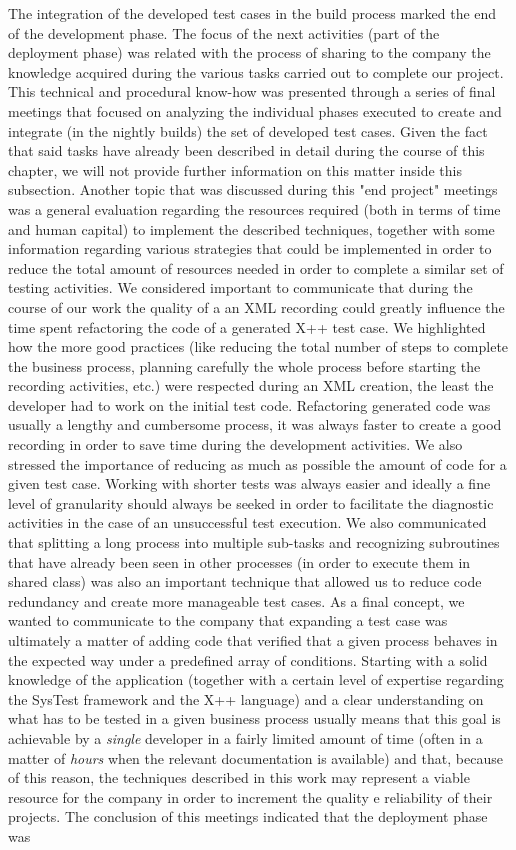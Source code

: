 The integration of the developed test cases in the build process marked the end of the development phase. The focus of the next activities (part of the deployment phase) was related with the process of sharing to the company the knowledge acquired during the various tasks carried out to complete our project. This technical and procedural know-how was presented through a series of final meetings that focused on analyzing the individual phases executed to create and integrate (in the nightly builds) the set of developed test cases. Given the fact that said tasks have already been described in detail during the course of this chapter, we will not provide further information on this matter inside this subsection. Another topic that was discussed during this "end project" meetings was a general evaluation regarding the resources required (both in terms of time and human capital) to implement the described techniques, together with some information regarding various strategies that could be implemented in order to reduce the total amount of resources needed in order to complete a similar set of testing activities. We considered important to communicate that during the course of our work the quality of a an XML recording could greatly influence the time spent refactoring the code of a generated X++ test case. We highlighted how the more good practices (like reducing the total number of steps to complete the business process, planning carefully the whole process before starting the recording activities, etc.) were respected during an XML creation, the least the developer had to work on the initial test code. Refactoring generated code was usually a lengthy and cumbersome process, it was always faster to create a good recording in order to save time during the development activities. We also stressed the importance of reducing as much as possible the amount of code for a given test case. Working with shorter tests was always easier and ideally a fine level of granularity should always be seeked in order to facilitate the diagnostic activities in the case of an unsuccessful test execution. We also communicated that splitting a long process into multiple sub-tasks and recognizing subroutines that have already been seen in other processes (in order to execute them in shared class) was also an important technique that allowed us to reduce code redundancy and create more manageable test cases. As a final concept, we wanted to communicate to the company that expanding a test case was ultimately a matter of adding code that verified that a given process behaves in the expected way under a predefined array of conditions. Starting with a solid knowledge of the application (together with a certain level of expertise regarding the SysTest framework and the X++ language) and a clear understanding on what has to be tested in a given business process usually means that this goal is achievable by a \textit{single} developer in a fairly limited amount of time (often in a matter of \textit{hours} when the relevant documentation is available) and that, because of this reason, the  techniques described in this work may represent a viable resource for the company in order to increment the quality e reliability of their projects. The conclusion of this meetings indicated that the deployment phase was 